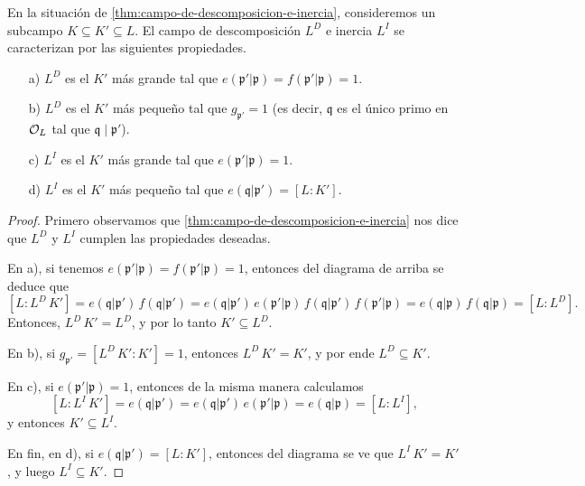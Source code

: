 \begin{proposicion}
  \label{prop:caracterizacion-de-campo-de-descomposicion-e-inercia}
  En la situación de \ref{thm:campo-de-descomposicion-e-inercia}, consideremos
  un subcampo $K \subseteq K' \subseteq L$. El campo de descomposición $L^D$
  e inercia $L^I$ se caracterizan por las siguientes propiedades.

  \begin{enumerate}
  \item[a)] $L^D$ es el $K'$ más grande tal que
    $e (\mathfrak{p}'|\mathfrak{p}) = f (\mathfrak{p}'|\mathfrak{p}) = 1$.

  \item[b)] $L^D$ es el $K'$ más pequeño tal que $g_{\mathfrak{p}'} = 1$
    (es decir, $\mathfrak{q}$ es el único primo en $\mathcal{O}_L$ tal que
    $\mathfrak{q} \mid \mathfrak{p}'$).

  \item[c)] $L^I$ es el $K'$ más grande tal que
    $e (\mathfrak{p}'|\mathfrak{p}) = 1$.

  \item[d)] $L^I$ es el $K'$ más pequeño tal que
    $e (\mathfrak{q}|\mathfrak{p}') = [L : K']$.
  \end{enumerate}

  \begin{proof}
    Primero observamos que \ref{thm:campo-de-descomposicion-e-inercia}
    nos dice que $L^D$ y $L^I$ cumplen las propiedades deseadas.

    En a), si tenemos
    $e (\mathfrak{p}'|\mathfrak{p}) = f (\mathfrak{p}'|\mathfrak{p}) = 1$,
    entonces del diagrama de arriba se deduce que
    \[ [L : L^D\,K'] =
       e (\mathfrak{q}|\mathfrak{p}')\,f (\mathfrak{q}|\mathfrak{p}') =
       e (\mathfrak{q}|\mathfrak{p}')\,e (\mathfrak{p}'|\mathfrak{p})\,
       f (\mathfrak{q}|\mathfrak{p}')\,f (\mathfrak{p}'|\mathfrak{p}) =
       e (\mathfrak{q}|\mathfrak{p})\,f (\mathfrak{q}|\mathfrak{p}) =
       [L : L^D]. \]
    Entonces, $L^D\,K' = L^D$, y por lo tanto $K' \subseteq L^D$.

    En b), si $g_{\mathfrak{p}'} = [L^D\,K' : K'] = 1$, entonces
    $L^D\,K' = K'$, y por ende $L^D \subseteq K'$.

    En c), si $e (\mathfrak{p}'|\mathfrak{p}) = 1$, entonces de la misma manera
    calculamos
    \[ [L : L^I\,K'] = e (\mathfrak{q}|\mathfrak{p}') =
       e (\mathfrak{q}|\mathfrak{p}')\,e (\mathfrak{p}'|\mathfrak{p}) =
       e (\mathfrak{q}|\mathfrak{p}) = [L : L^I], \]
    y entonces $K' \subseteq L^I$.

    En fin, en d), si $e (\mathfrak{q}|\mathfrak{p}') = [L:K']$, entonces del
    diagrama se ve que $L^I\,K' = K'$, y luego $L^I \subseteq K'$.
  \end{proof}
\end{proposicion}

